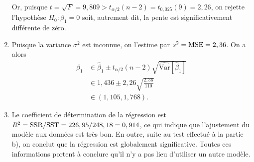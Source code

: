 \begin{solution}{2.13}
\begin{enumerate}
      Or, puisque $t = \sqrt{F} = 9,809 > t_{\alpha/2}(n-2) =
      t_{0,025}(9) = 2,26$, on rejette l'hypothèse $H_0: \beta_1 =
      0$ soit, autrement dit, la pente est significativement
      différente de zéro.
    \item Puisque la variance $\sigma^2$ est inconnue, on l'estime par
      $s^2 = \mathrm{MSE} = 2,36$. On a alors
      \begin{align*}
        \beta_1
        &\in \hat{\beta}_1 \pm t_{\alpha/2}(n-2)
        \sqrt{\widehat{\mathrm{Var}}[\hat{\beta}_1]} \\
        &\in 1,436 \pm 2,26 \sqrt{\frac{2,36}{110}} \\
        &\in (1,105, 1,768).
      \end{align*}
    \item Le coefficient de détermination de la régression est $R^2 =
      \mathrm{SSR}/\mathrm{SST} = 226,95/248,18 = 0,914$, ce qui indique que
      l'ajustement du modèle aux données est très bon. En outre, suite
      au test effectué à la partie b), on conclut que la régression
      est globalement significative.  Toutes ces informations portent
      à conclure qu'il n'y a pas lieu d'utiliser un autre modèle.
    \end{enumerate}
  
\end{solution}
